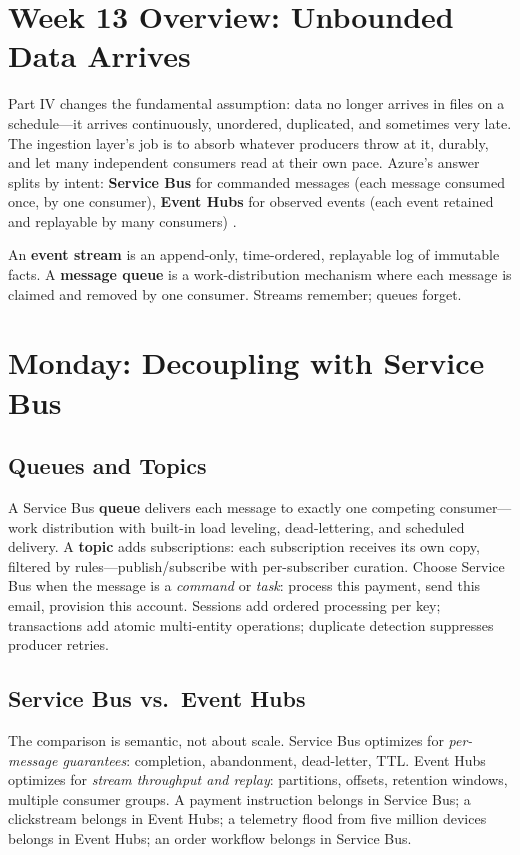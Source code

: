 \section{Week 13 Overview: Unbounded Data Arrives}
Part IV changes the fundamental assumption: data no longer arrives in files on a schedule---it arrives continuously, unordered, duplicated, and sometimes very late. The ingestion layer's job is to absorb whatever producers throw at it, durably, and let many independent consumers read at their own pace. Azure's answer splits by intent: \textbf{Service Bus} for commanded messages (each message consumed once, by one consumer), \textbf{Event Hubs} for observed events (each event retained and replayable by many consumers) \cite{microsoft2025eventhubs}.

\begin{definitionbox}
An \textbf{event stream} is an append-only, time-ordered, replayable log of immutable facts. A \textbf{message queue} is a work-distribution mechanism where each message is claimed and removed by one consumer. Streams remember; queues forget.
\end{definitionbox}

\section{Monday: Decoupling with Service Bus}

\subsection{Queues and Topics}
A Service Bus \textbf{queue} delivers each message to exactly one competing consumer---work distribution with built-in load leveling, dead-lettering, and scheduled delivery. A \textbf{topic} adds subscriptions: each subscription receives its own copy, filtered by rules---publish/subscribe with per-subscriber curation. Choose Service Bus when the message is a \emph{command} or \emph{task}: process this payment, send this email, provision this account. Sessions add ordered processing per key; transactions add atomic multi-entity operations; duplicate detection suppresses producer retries.

\subsection{Service Bus vs.\ Event Hubs}
The comparison is semantic, not about scale. Service Bus optimizes for \emph{per-message guarantees}: completion, abandonment, dead-letter, TTL. Event Hubs optimizes for \emph{stream throughput and replay}: partitions, offsets, retention windows, multiple consumer groups. A payment instruction belongs in Service Bus; a clickstream belongs in Event Hubs; a telemetry flood from five million devices belongs in Event Hubs; an order workflow belongs in Service Bus.

